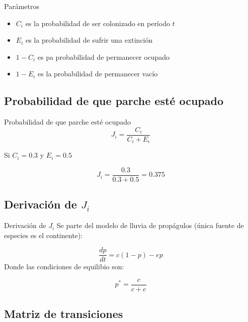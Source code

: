 \documentclass[
  11pt,
  ignorenonframetext,
]{beamer}
\begin{document}
\begin{frame}{Parámetros}
\begin{itemize}
\item
  \(C_i\) es la probabilidad de ser colonizado en período \(t\)
\item
  \(E_i\) es la probabilidad de sufrir una extinción
\item
  \(1-C_i\) es pa probabilidad de permanecer ocupado
\item
  \(1 - E_i\) es la probabilidad de permanecer vacío
\end{itemize}
\end{frame}

\hypertarget{probabilidad-de-que-parche-estuxe9-ocupado}{%
\subsection{Probabilidad de que parche esté
ocupado}\label{probabilidad-de-que-parche-estuxe9-ocupado}}

\begin{frame}{Probabilidad de que parche esté ocupado}
\begin{equation}
J_i = \frac{C_i}{C_i + E_i}
\end{equation}

Si \(C_i = 0.3\) y \(E_i = 0.5\)

\begin{equation}
J_i = \frac{0.3}{0.3 + 0.5} = 0.375
\end{equation}
\end{frame}

\hypertarget{derivaciuxf3n-de-j_i}{%
\subsection{\texorpdfstring{Derivación de
\(J_i\)}{Derivación de J\_i}}\label{derivaciuxf3n-de-j_i}}

\begin{frame}{Derivación de \(J_i\)}
Se parte del modelo de lluvia de propágulos (única fuente de especies es
el continente):

\[\frac{dp}{dt} = c(1-p) - ep\] Donde las condiciones de equilibio son:

\[p^* = \frac{c}{c+e}\]
\end{frame}

\hypertarget{matriz-de-transiciones}{%
\subsection{Matriz de transiciones}\label{matriz-de-transiciones}}
\end{document}
